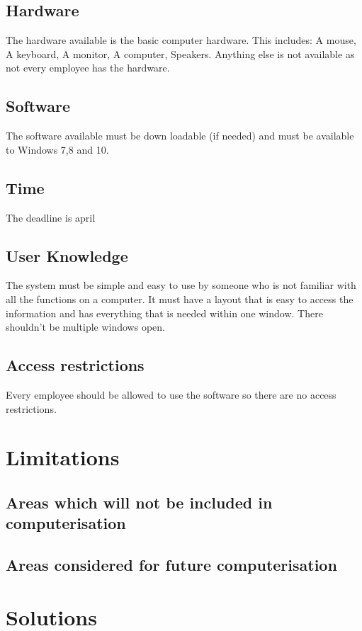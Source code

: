 \subsection{Hardware}
The hardware available is the basic computer hardware. This includes: A mouse, A keyboard, A monitor, A computer, Speakers. Anything else is not available as not every employee has the hardware.

\subsection{Software}
The software available must be down loadable (if needed) and must be available to Windows 7,8 and 10.
\subsection{Time}
The deadline is april
\subsection{User Knowledge}
The system must be simple and easy to use by someone who is not familiar with all the functions on a computer. It must have a layout that is easy to access the information and has everything that is needed within one window. There shouldn't be multiple windows open.
\subsection{Access restrictions}
Every employee should be allowed to use the software so there are no access restrictions.

\section{Limitations}

\subsection{Areas which will not be included in computerisation}

\subsection{Areas considered for future computerisation}

\section{Solutions}

